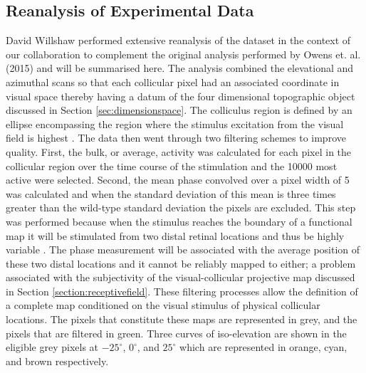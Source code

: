 \subsection{Reanalysis of Experimental Data \label{section:davidsresults}}
David Willshaw performed extensive reanalysis of the dataset in the context of our collaboration to complement the original analysis performed by Owens et. al. (2015) and will be summarised here. The analysis combined the elevational and azimuthal scans so that each collicular pixel had an associated coordinate in visual space thereby having a datum of the four dimensional topographic object discussed in Section \ref{sec:dimensionspace}. The colliculus region is defined by an ellipse encompassing the region where the stimulus excitation from the visual field is highest \cite{Kalatsky2003-cz}. The data then went through two filtering schemes to improve quality. First, the bulk, or average, activity was calculated for each pixel in the collicular region over the time course of the stimulation and the 10000 most active were selected. Second, the mean phase convolved over a pixel width of 5 was calculated and when the standard deviation of this mean is three times greater than the wild-type standard deviation the pixels are excluded. This step was performed because when the stimulus reaches the boundary of a functional map it will be stimulated from two distal retinal locations and thus be highly variable \cite{Willshaw2014-ms}. The phase measurement will be associated with the average position of these two distal locations and it cannot be reliably mapped to either; a problem associated with the subjectivity of the visual-collicular projective map discussed in Section \ref{section:receptivefield}. These filtering processes allow the definition of a complete map conditioned on the visual stimulus of physical collicular locations. The pixels that constitute these maps are represented in grey, and the pixels that are filtered in green. Three curves of iso-elevation are shown in the eligible grey pixels at $-25^\circ$, $0^\circ$, and $25^\circ$ which are represented in orange, cyan, and brown respectively.

